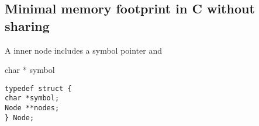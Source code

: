 \subsection{Minimal memory footprint in C without sharing}

A inner node includes a symbol pointer and 

char * symbol

\begin{lstlisting}
typedef struct {
char *symbol;
Node **nodes;
} Node;

\end{lstlisting}